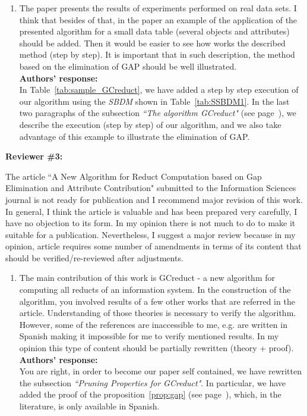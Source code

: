 \documentclass{letter}
\begin{document}
\begin{letter}{}
\begin{enumerate}
	\item The paper presents the results of experiments performed on real data sets. I think that besides of that, in the paper an example of the application of the presented algorithm for a small data table (several objects and attributes) should be added. Then it would be easier to see how works the described method (step by step). It is important that in such description, the method based on the elimination of GAP should be well illustrated.\\
	\textbf{Authors’ response:} \\
	In Table~\ref{tab:sample_GCreduct}, we have added a step by step execution of our algorithm using  the \textit{SBDM} shown in Table~\ref{tab:SSBDM1}. In the last two paragraphs of the subsection \textit{``The algorithm GCreduct"} (see page~\pageref{par:step}), we describe the execution (step by step) of our algorithm, and we also take advantage of this example to illustrate the elimination of GAP.
  \end{enumerate}    
  
  
  \textbf{Reviewer \#3:}
  
  The article ``A New Algorithm for Reduct Computation based on Gap Elimination and Attribute Contribution" submitted to the Information Sciences journal is not ready for publication and I recommend major revision of this work. In general, I think the article is valuable and has been prepared very carefully, I have no objection to its form. In my opinion there is not much to do to make it suitable for a publication. Nevertheless, I suggest a major review because in my opinion, article requires some number of amendments in terms of its content that should be verified/re-reviewed after adjustments.  
  
  \begin{enumerate}
	\item The main contribution of this work is GCreduct - a new algorithm for computing all reducts of an information system. In the construction of the algorithm, you involved results of a few other works that are referred in the article.  Understanding of those theories is necessary to verify the algorithm. However, some of the references are inaccessible  to me, e.g. are written in Spanish making it impossible for me to verify mentioned results. In my opinion this type of content should be partially rewritten (theory + proof).\\
	\textbf{Authors’ response:} \\
	You are right, in order to become our paper self contained, we have rewritten the subsection \textit{``Pruning Properties for GCreduct"}. In particular, we have added the proof of the proposition~\ref{prop:gap} (see page~\pageref{proof:gap}), which, in the literature, is only available in Spanish.
	

\end{enumerate}
\end{letter}
\end{document}
